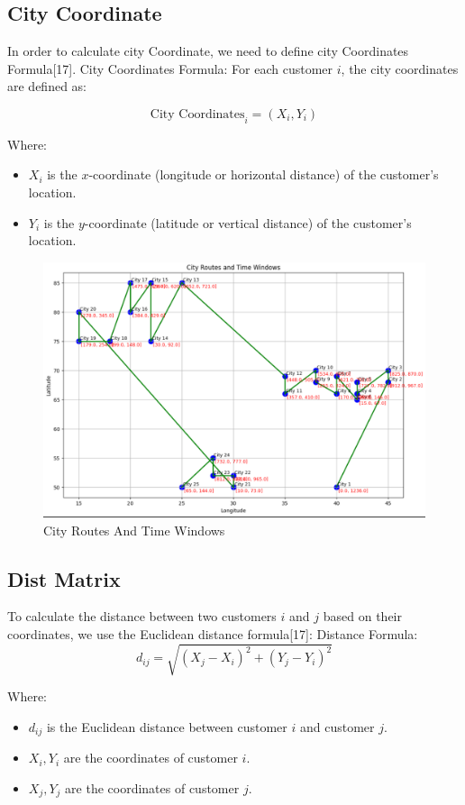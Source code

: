 \subsection{City Coordinate}
In order to calculate city Coordinate, we need to define city Coordinates Formula[17]. 
\newline
City Coordinates Formula:
\newline
For each customer \(i\), the city coordinates are defined as:

\[
\text{City Coordinates}_i = (X_i, Y_i)
\]

Where:
\begin{itemize}
    \item \( X_i \) is the \(x\)-coordinate (longitude or horizontal distance) of the customer's location.
    \item \( Y_i \) is the \(y\)-coordinate (latitude or vertical distance) of the customer's location.
\end{itemize}
\begin{figure}[H]
    \centering
    \includegraphics[width=0.8\linewidth]{figures/Citye_Routes_And_Time_Windows.PNG}
    \caption{City Routes And Time Windows}
    \label{fig:City Routes And Time Windows}
\end{figure}
\subsection{Dist Matrix}
To calculate the distance between two customers \(i\) and \(j\) based on their coordinates, we use the Euclidean distance formula[17]:
\newline Distance Formula:
\newline
\[
d_{ij} = \sqrt{(X_j - X_i)^2 + (Y_j - Y_i)^2}
\]

Where:
\begin{itemize}
    \item \( d_{ij} \) is the Euclidean distance between customer \(i\) and customer \(j\).
    \item \( X_i, Y_i \) are the coordinates of customer \(i\).
    \item \( X_j, Y_j \) are the coordinates of customer \(j\).
\end{itemize}
